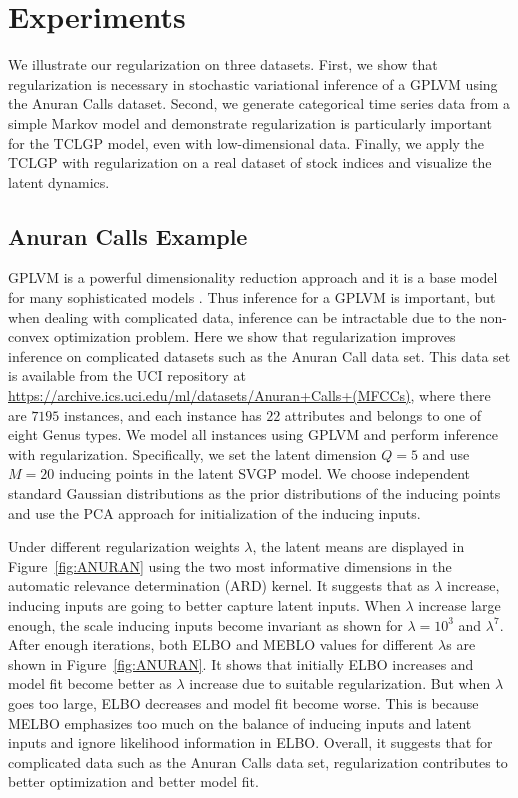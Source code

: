 \documentclass{article}
\begin{document}
\section{Experiments} \label{sec:E}
We illustrate our regularization on three datasets. First, we show that regularization is necessary in stochastic variational inference of a GPLVM using the Anuran Calls dataset. Second, we generate categorical time series data from a simple Markov model and demonstrate regularization is particularly important for the TCLGP model, even with low-dimensional data. Finally, we apply the TCLGP with regularization on a real dataset of stock indices and visualize the latent dynamics.

\subsection{Anuran Calls Example} \label{sec:Anuran}
GPLVM is a powerful dimensionality reduction approach \citep{Lawrence_2003, Lawrence_2007} and it is a base model for many sophisticated models \citep{Lawrence_2007_HGP, Urtasun_2007, Damianou_2016}. Thus inference for a GPLVM is important, but when dealing with complicated data, inference can be intractable due to the non-convex optimization problem. Here we show that regularization improves inference on complicated datasets such as the Anuran Call data set. This data set is available from the UCI repository at \url{https://archive.ics.uci.edu/ml/datasets/Anuran+Calls+(MFCCs)}, where there are $7195$ instances, and each instance has $22$ attributes and belongs to one of eight Genus types. We model all instances using GPLVM and perform inference with regularization. Specifically, we set the latent dimension $Q = 5$ and use $M = 20$ inducing points in the latent SVGP model. We choose independent standard Gaussian distributions as the prior distributions of the inducing points and use the PCA approach for initialization of the inducing inputs.

Under different regularization weights $\lambda$, the latent means are displayed in Figure~\ref{fig:ANURAN} using the two most informative dimensions in the automatic relevance determination (ARD) kernel. It suggests that as $\lambda$ increase, inducing inputs are going to better capture latent inputs. When $\lambda$ increase large enough, the scale inducing inputs become invariant as shown for $\lambda = 10^3$ and $\lambda^7$. After enough iterations, both ELBO and MEBLO values for different $\lambda$s are shown in Figure~\ref{fig:ANURAN}. It shows that initially ELBO increases and model fit become better as $\lambda$ increase due to suitable regularization. But when $\lambda$ goes too large, ELBO decreases and model fit become worse. This is because MELBO emphasizes too much on the balance of inducing inputs and latent inputs and ignore likelihood information in ELBO. Overall, it suggests that for complicated data such as the Anuran Calls data set, regularization contributes to better optimization and better model fit.
\end{document}
